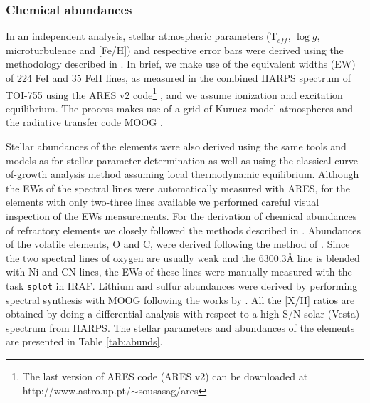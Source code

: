 \documentclass[fleqn,usenatbib]{mnras}
\begin{document}
\subsubsection{Chemical abundances}            \label{sec:parameters}

In an independent analysis, stellar atmospheric parameters (T$_{eff}$, $\log{g}$, microturbulence and [Fe/H]) and respective error bars were derived using the methodology described in \citet{Sousa-14, Santos-13}. In brief, we make use of the equivalent widths (EW) of 224 FeI and 35 FeII lines, as measured in the combined HARPS spectrum of TOI-755 using the ARES v2 code\footnote{The last version of ARES code (ARES v2) can be downloaded at http://www.astro.up.pt/$\sim$sousasag/ares} \citep{Sousa-15}, and we assume ionization and excitation equilibrium. The process makes use of a grid of Kurucz model atmospheres \citep{Kurucz-93} and the radiative transfer code MOOG \citep{Sneden-73}.

Stellar abundances of the elements were also derived using the same tools and models as for stellar parameter determination as well as using the classical curve-of-growth analysis method assuming local thermodynamic equilibrium. Although the EWs of the spectral lines were automatically measured with ARES, for the elements with only two-three lines available we performed careful visual inspection of the EWs measurements. For the derivation of chemical abundances of refractory elements we closely followed the methods described in \citep[e.g.][]{Adibekyan-12, Adibekyan-15, Delgado-14, Delgado-17}. Abundances of the volatile elements, O and C, were derived following the method of \cite{Delgado-10, Bertrandelis-15}. Since the two spectral lines of oxygen are usually weak and the 6300.3\AA{} line is blended with Ni and CN lines, the EWs of these lines were manually measured with the task \texttt{splot} in IRAF. Lithium and sulfur abundances were derived by performing spectral synthesis with MOOG following the works by \citet[][,respectively]{Delgado-14,Costa_Silva2020}. All the [X/H] ratios are obtained by doing a differential analysis with respect to a high S/N solar (Vesta) spectrum from HARPS. The stellar parameters and abundances of the elements are presented in Table \ref{tab:abunds}. 
\end{document}
